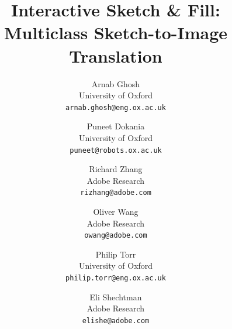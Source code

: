 \documentclass[10pt,twocolumn,letterpaper]{article}
\begin{document}
\title{Interactive Sketch \& Fill: Multiclass Sketch-to-Image Translation}

\author{Arnab Ghosh\\
University of Oxford\\
{\tt\small arnab.ghosh@eng.ox.ac.uk}
\and
Puneet Dokania\\
University of Oxford\\
{\tt\small puneet@robots.ox.ac.uk}
\and
Richard Zhang\\
Adobe Research\\
{\tt\small rizhang@adobe.com}
\and
Oliver Wang\\
Adobe Research\\
{\tt\small owang@adobe.com}
\and
Philip Torr\\
University of Oxford\\
{\tt\small philip.torr@eng.ox.ac.uk}
\and
Eli Shechtman\\
Adobe Research\\
{\tt\small elishe@adobe.com}
}

\end{document}

